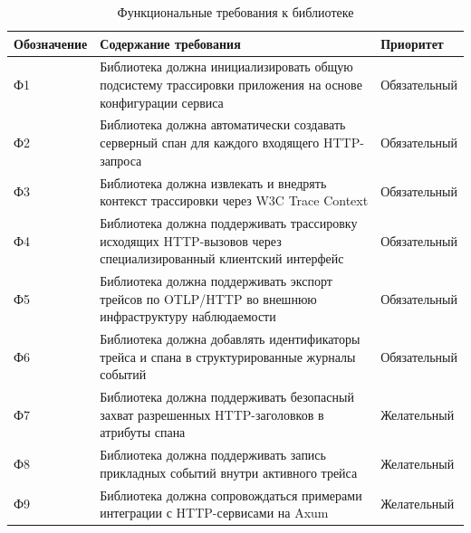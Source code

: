 \begin{table}[H]
    \centering
    \caption{Функциональные требования к библиотеке}
    \label{tab:functional-requirements}
    \renewcommand{\arraystretch}{1.2}
    \begin{tabularx}{\textwidth}{>{\raggedright\arraybackslash}p{1.6cm} >{\raggedright\arraybackslash}X >{\raggedright\arraybackslash}p{2.1cm}}
        \toprule
        Обозначение & Содержание требования & Приоритет \\
        \midrule
        Ф1 & Библиотека должна инициализировать общую подсистему трассировки приложения на основе конфигурации сервиса & Обязательный \\
        \addlinespace
        Ф2 & Библиотека должна автоматически создавать серверный спан для каждого входящего HTTP-запроса & Обязательный \\
        \addlinespace
        Ф3 & Библиотека должна извлекать и внедрять контекст трассировки через W3C Trace Context & Обязательный \\
        \addlinespace
        Ф4 & Библиотека должна поддерживать трассировку исходящих HTTP-вызовов через специализированный клиентский интерфейс & Обязательный \\
        \addlinespace
        Ф5 & Библиотека должна поддерживать экспорт трейсов по OTLP/HTTP во внешнюю инфраструктуру наблюдаемости & Обязательный \\
        \addlinespace
        Ф6 & Библиотека должна добавлять идентификаторы трейса и спана в структурированные журналы событий & Обязательный \\
        \addlinespace
        Ф7 & Библиотека должна поддерживать безопасный захват разрешенных HTTP-заголовков в атрибуты спана & Желательный \\
        \addlinespace
        Ф8 & Библиотека должна поддерживать запись прикладных событий внутри активного трейса & Желательный \\
        \addlinespace
        Ф9 & Библиотека должна сопровождаться примерами интеграции с HTTP-сервисами на Axum & Желательный \\
        \bottomrule
    \end{tabularx}
\end{table}

